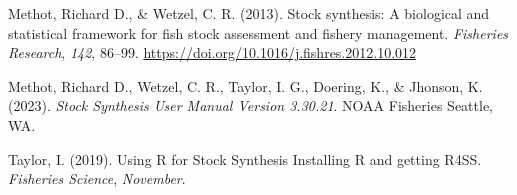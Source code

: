 \documentclass[
]{article}
\newlength{\cslhangindent}
\newlength{\cslentryspacingunit} %
\newenvironment{CSLReferences}[2] %
 {%
  \setlength{\parindent}{0pt}
  \ifodd #1
  \let\oldpar\par
  \def\par{\hangindent=\cslhangindent\oldpar}
  \fi
  \setlength{\parskip}{#2\cslentryspacingunit}
 }%
 {}
\begin{document}
\hypertarget{refs}{}
\begin{CSLReferences}{1}{0}
\leavevmode{}%
Methot, Richard D., \& Wetzel, C. R. (2013). {Stock synthesis: A biological and statistical framework for fish stock assessment and fishery management}. \emph{Fisheries Research}, \emph{142}, 86--99. \url{https://doi.org/10.1016/j.fishres.2012.10.012}

\leavevmode{}%
Methot, Richard D., Wetzel, C. R., Taylor, I. G., Doering, K., \& Jhonson, K. (2023). \emph{{Stock Synthesis User Manual Version 3.30.21}}. NOAA Fisheries Seattle, WA.

\leavevmode{}%
Taylor, I. (2019). {Using R for Stock Synthesis Installing R and getting R4SS}. \emph{Fisheries Science}, \emph{November}.

\end{CSLReferences}
\end{document}
